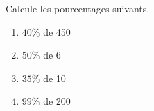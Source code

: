 %
%
	Calcule les pourcentages suivants.
	\begin{enumerate}[cols=4]
		\item \(40\%\) de 450
		\item \(50\%\) de 6
		\item \(35\%\) de 10
		\item \(99\%\) de 200
	\end{enumerate}
